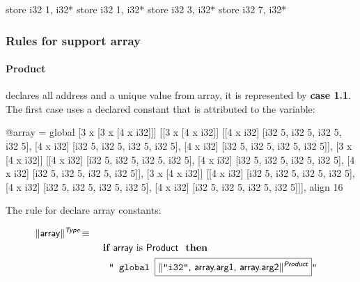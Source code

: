 \documentclass{llncs}
\newcommand{\trad}[2]{\ensuremath{\lVert \textsf{#1} \rVert^{\textit{#2}}}}
\DeclareMathOperator{\isdef}{\equiv}
\newcommand{\llvm}[1]{\texttt{#1}}
\newcommand{\B}[1]{\textsf{#1}}
\newcommand{\IF}[0]{\textbf{ if }}
\newcommand{\ELSIF}[0]{\textbf{ else if }}
\newcommand{\THEN}[0]{\textbf{ then }}
\newcommand{\PH}[1]{\framebox{$#1$}}
\begin{document}
\begin{llvmcode}
store i32 1, i32* %
store i32 1, i32* %
store i32 3, i32* %
store i32 7, i32* %
\end{llvmcode}


\subsubsection{Rules for support array}

\paragraph{Product} declares all address and a unique value from array, it is represented by \textbf{case 1.1}.
The first case uses a declared constant that is attributed to the variable:
\begin{llvmcode}
@array = global [3 x [3 x [4 x i32]]] 
[[3 x [4 x i32]] 
	[[4 x i32] [i32 5, i32 5, i32 5, i32 5], 
	 [4 x i32] [i32 5, i32 5, i32 5, i32 5], 
	 [4 x i32] [i32 5, i32 5, i32 5, i32 5]], 
 [3 x [4 x i32]] 
	[[4 x i32] [i32 5, i32 5, i32 5, i32 5],
	 [4 x i32] [i32 5, i32 5, i32 5, i32 5],
	 [4 x i32] [i32 5, i32 5, i32 5, i32 5]],
 [3 x [4 x i32]] 
	[[4 x i32] [i32 5, i32 5, i32 5, i32 5],
	 [4 x i32] [i32 5, i32 5, i32 5, i32 5], 
	 [4 x i32] [i32 5, i32 5, i32 5, i32 5]]], align 16
\end{llvmcode}

The rule for declare array constants:


\begin{align*}
\begin{split}
  \trad{array}{\B{Type}} \isdef \\
   & \quad \IF \B{array} \mbox{ is \B{Product} } \THEN \\
   & \quad \quad \llvm{" global \PH{\trad{\llvm{"i32"}, array.arg1, array.arg2}{\B{Product}}}"}\\
\end{split}
\end{align*}
\end{document}
